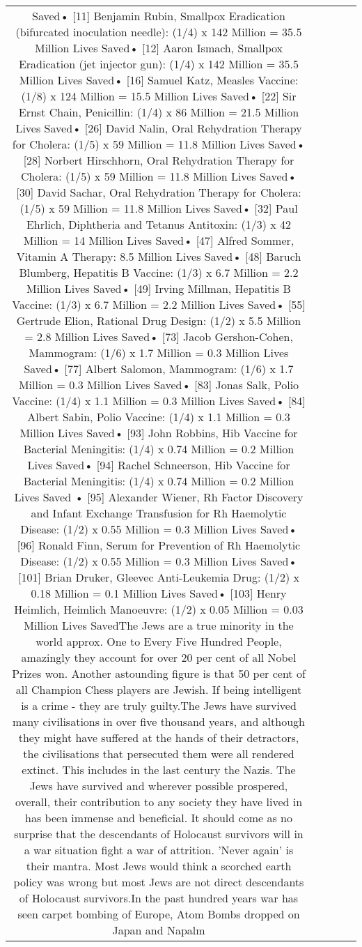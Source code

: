\documentclass[11pt]{article}
\newlength\mylength
\begin{document}
\begin{center}
\begin{longtable}{|C{.65\mylength}|C{.30\mylength}|C{.12\mylength}|C{.12\mylength}|C{.12\mylength}|}
Saved• [11] Benjamin Rubin, Smallpox Eradication (bifurcated inoculation needle): (1/4) x 142 Million = 35.5 Million Lives Saved• [12] Aaron Ismach, Smallpox Eradication (jet injector gun): (1/4) x 142 Million = 35.5 Million Lives Saved• [16] Samuel Katz, Measles Vaccine: (1/8) x 124 Million = 15.5 Million Lives Saved• [22] Sir Ernst Chain, Penicillin: (1/4) x 86 Million = 21.5 Million Lives Saved• [26] David Nalin, Oral Rehydration Therapy for Cholera: (1/5) x 59 Million = 11.8 Million Lives Saved• [28] Norbert Hirschhorn, Oral Rehydration Therapy for Cholera: (1/5) x 59 Million = 11.8 Million Lives Saved• [30] David Sachar, Oral Rehydration Therapy for Cholera: (1/5) x 59 Million = 11.8 Million Lives Saved• [32] Paul Ehrlich, Diphtheria and Tetanus Antitoxin: (1/3) x 42 Million = 14 Million Lives Saved• [47] Alfred Sommer, Vitamin A Therapy: 8.5 Million Lives Saved• [48] Baruch Blumberg, Hepatitis B Vaccine: (1/3) x 6.7 Million = 2.2 Million Lives Saved• [49] Irving Millman, Hepatitis B Vaccine: (1/3) x 6.7 Million = 2.2 Million Lives Saved• [55] Gertrude Elion, Rational Drug Design: (1/2) x 5.5 Million = 2.8 Million Lives Saved• [73] Jacob Gershon-Cohen, Mammogram: (1/6) x 1.7 Million = 0.3 Million Lives Saved• [77] Albert Salomon, Mammogram: (1/6) x 1.7 Million = 0.3 Million Lives Saved• [83] Jonas Salk, Polio Vaccine: (1/4) x 1.1 Million = 0.3 Million Lives Saved• [84] Albert Sabin, Polio Vaccine: (1/4) x 1.1 Million = 0.3 Million Lives Saved• [93] John Robbins, Hib Vaccine for Bacterial Meningitis:  (1/4) x 0.74 Million = 0.2 Million Lives Saved• [94] Rachel Schneerson, Hib Vaccine for Bacterial Meningitis: (1/4) x 0.74 Million = 0.2 Million Lives Saved • [95] Alexander Wiener, Rh Factor Discovery and Infant Exchange Transfusion for Rh Haemolytic Disease: (1/2) x 0.55 Million = 0.3 Million Lives Saved• [96] Ronald Finn, Serum for Prevention of Rh Haemolytic Disease: (1/2) x 0.55 Million = 0.3 Million Lives Saved• [101] Brian Druker, Gleevec Anti-Leukemia Drug: (1/2) x 0.18 Million = 0.1 Million Lives Saved• [103] Henry Heimlich, Heimlich Manoeuvre: (1/2) x 0.05 Million = 0.03 Million Lives SavedThe Jews are a true minority in the world approx. One to Every Five Hundred People, amazingly they account for over 20 per cent of all Nobel Prizes won. Another astounding figure is that 50 per cent of all Champion Chess players are Jewish. If being intelligent is a crime - they are truly guilty.The Jews have survived many civilisations in over five thousand years, and although they might have suffered at the hands of their detractors, the civilisations that persecuted them were all rendered extinct. This includes in the last century the Nazis. The Jews have survived and wherever possible prospered, overall, their contribution to any society they have lived in has been immense and beneficial. It should come as no surprise that the descendants of Holocaust survivors will in a war situation fight a war of attrition. 'Never again' is their mantra. Most Jews would think a scorched earth policy was wrong but most Jews are not direct descendants of Holocaust survivors.In the past hundred years war has seen carpet bombing of Europe, Atom Bombs dropped on Japan and Napalm 
\end{longtable}
\end{center}
\end{document}
